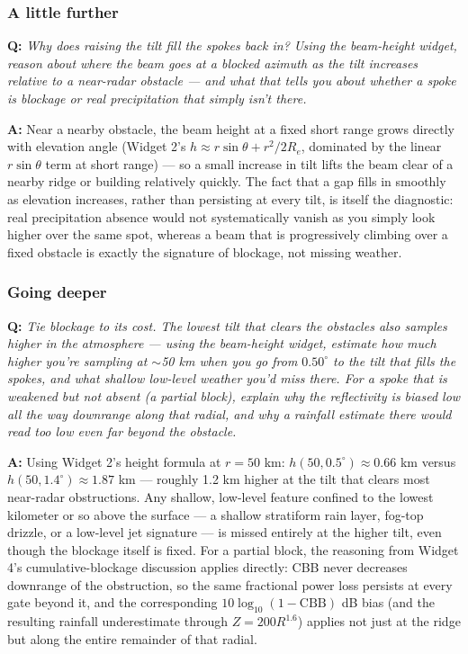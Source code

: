 \documentclass[11pt]{article}
\newenvironment{qa}[1]{\par\noindent\textbf{\color{qgray}Q: }\emph{#1}\par\noindent\textbf{A: }}{\par\vspace{6pt}}
\newcommand{\tier}[1]{\subsubsection*{#1}}
\begin{document}
\tier{A little further}
\begin{qa}{Why does raising the tilt fill the spokes back in? Using the beam-height widget, reason about where the beam goes at a blocked azimuth as the tilt increases relative to a near-radar obstacle --- and what that tells you about whether a spoke is blockage or real precipitation that simply isn't there.}
Near a nearby obstacle, the beam height at a fixed short range grows directly with elevation angle (Widget 2's $h\approx r\sin\theta+r^2/2R_e$, dominated by the linear $r\sin\theta$ term at short range) --- so a small increase in tilt lifts the beam clear of a nearby ridge or building relatively quickly. The fact that a gap fills in smoothly as elevation increases, rather than persisting at every tilt, is itself the diagnostic: real precipitation absence would not systematically vanish as you simply look higher over the same spot, whereas a beam that is progressively climbing over a fixed obstacle is exactly the signature of blockage, not missing weather.
\end{qa}

\tier{Going deeper}
\begin{qa}{Tie blockage to its cost. The lowest tilt that clears the obstacles also samples higher in the atmosphere --- using the beam-height widget, estimate how much higher you're sampling at $\sim$50 km when you go from $0.50^\circ$ to the tilt that fills the spokes, and what shallow low-level weather you'd miss there. For a spoke that is weakened but not absent (a partial block), explain why the reflectivity is biased low all the way downrange along that radial, and why a rainfall estimate there would read too low even far beyond the obstacle.}
Using Widget 2's height formula at $r=50$ km: $h(50,0.5^\circ)\approx0.66$ km versus $h(50,1.4^\circ)\approx1.87$ km --- roughly 1.2 km higher at the tilt that clears most near-radar obstructions. Any shallow, low-level feature confined to the lowest kilometer or so above the surface --- a shallow stratiform rain layer, fog-top drizzle, or a low-level jet signature --- is missed entirely at the higher tilt, even though the blockage itself is fixed. For a partial block, the reasoning from Widget 4's cumulative-blockage discussion applies directly: CBB never decreases downrange of the obstruction, so the same fractional power loss persists at every gate beyond it, and the corresponding $10\log_{10}(1-\mathrm{CBB})$ dB bias (and the resulting rainfall underestimate through $Z=200R^{1.6}$) applies not just at the ridge but along the entire remainder of that radial.
\end{qa}
\clearpage
\end{document}
